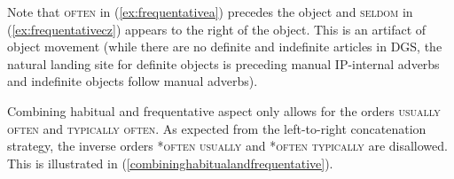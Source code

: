 \begin{exe}
\ex\label{referbacktome}\begin{xlist} 
\end{xlist}
\end{exe}   




\noindent Note that \textsc{often} in (\ref{ex:frequentativea}) precedes the object and \textsc{seldom} in (\ref{ex:frequentativecz}) appears to the right of the object. This is an artifact of object movement (while there are no definite and indefinite articles in DGS, the natural landing site for definite objects is preceding manual IP-internal adverbs and indefinite objects follow manual adverbs). 

Combining habitual and frequentative aspect only allows for the orders \textsc{usually often} and \textsc{typically often}. As expected from the left-to-right concatenation strategy, the inverse orders *\textsc{often usually} and *\textsc{often typically} are disallowed. This is illustrated in (\ref{combininghabitualandfrequentative}). 




\begin{exe}
\ex\label{combininghabitualandfrequentative}\begin{xlist} 
\end{xlist}
\end{exe} 

